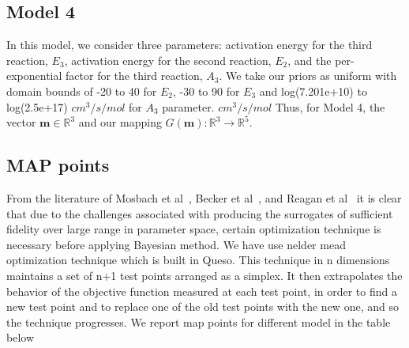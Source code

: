 \subsection{Model 4}


 In this model, we consider three parameters: activation energy for
 the third reaction, $E_3$,
 activation energy for the second reaction, $E_2$, and the per-exponential
 factor for the third reaction, $A_3$. We take our priors as uniform
 with domain bounds of -20 to 40 for $E_2$, -30 to 90 for $E_3$ and
 log(7.201e+10) to log(2.5e+17) $cm^3/s/mol$ for $A_3$ parameter. $cm^3/s/mol$
Thus, for Model 4, the vector
 $\mathbf{m} \in \mathbb{R}^3$ and our mapping $G(\mathbf{m}):
\mathbb{R}^3 \rightarrow \mathbb{R}^5$.


\subsection{MAP points}

From the literature of Mosbach et al~\cite{mosbac}, Becker et al~\cite{Braack}, and Reagan et al~\cite{Reagan} it is clear that  due to the challenges associated with producing the surrogates of sufficient fidelity over large range in parameter space, certain optimization technique is necessary before applying Bayesian method. We have use nelder mead optimization technique  which is built in Queso. This technique in n dimensions maintains a set of n+1 test points arranged as a simplex. It then extrapolates the behavior of the objective function measured at each test point, in order to find a new test point and to replace one of the old test points with the new one, and so the technique progresses. We report map points for different model in the table below

